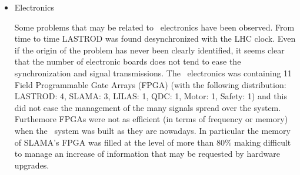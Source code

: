 \begin{itemize}
\item{Electronics}

Some problems that may be related to \lasi~electronics have been observed. From time to time LASTROD was found desynchronized with the LHC clock. Even if the origin of the problem has never been clearly identified, it seems clear that the number of electronic boards does not tend to ease the synchronization and signal transmissions. The \lasi~electronics was containing 11 Field Programmable Gate Arrays (FPGA) (with the following distribution: LASTROD: 4, SLAMA: 3, LILAS: 1, QDC: 1, Motor: 1, Safety: 1) and this did not ease the management of the many signals spread over the system. Furthemore FPGAs were not as efficient (in terms of frequency or memory) when the \lasi~system was built as they are nowadays. In particular the memory of SLAMA's FPGA was filled at the level of more than 80\% making difficult to manage an increase of information that may be requested by hardware upgrades.  



\end{itemize}
